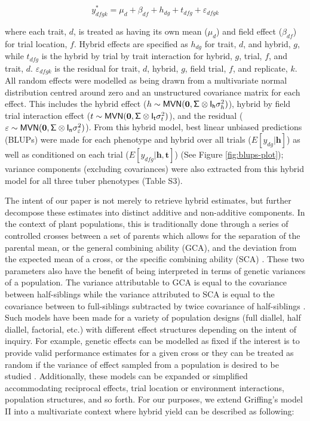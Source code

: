 \begin{equation}
y_{dfgk}^* = \mu_d + \beta_{df} + h_{dg} + t_{dfg} + \varepsilon_{dfgk}
\label{eq:hybrid}
\end{equation}

where each trait, \(d\), is treated as having its own mean (\(\mu_d\)) and field effect (\(\beta_{df}\)) for trial location, \(f\). Hybrid effects are specified as \(h_{dg}\) for trait, \(d\), and hybrid, \(g\), while \(t_{dfg}\) is the hybrid by trial by trait interaction for hybrid, \(g\), trial, \(f\), and trait, \(d\). \(\varepsilon_{dfgk}\) is the residual for trait, \(d\), hybrid, \(g\), field trial, \(f\), and replicate, \(k\). All random effects were modelled as being drawn from a multivariate normal distribution centred around zero and an unstructured covariance matrix for each effect. This includes the hybrid effect (\(h\sim \mathsf{MVN}({\bf 0},\mathsf{\Sigma\otimes I_h} \sigma_h^2)\)), hybrid by field trial interaction effect (\(t\sim \mathsf{MVN}({\bf 0},\mathsf{\Sigma\otimes I_t}\sigma_t^2)\)), and the residual (\(\varepsilon \sim \mathsf{MVN}({\bf 0},\mathsf{\Sigma\otimes I_n}\sigma_\varepsilon^2)\)). From this hybrid model, best linear unbiased predictions (BLUPs) were made for each phenotype and hybrid over all trials (\(E[y_{dg}|\mathbf{h}]\)) as well as conditioned on each trial (\(E[y_{dfg}|\mathbf{h},\mathbf{t}]\)) (See Figure \ref{fig:blups-plot}); variance components (excluding covariances) were also extracted from this hybrid model for all three tuber phenotypes (Table S3).

The intent of our paper is not merely to retrieve hybrid estimates, but further decompose these estimates into distinct additive and non-additive components. In the context of plant populations, this is traditionally done through a series of controlled crosses between a set of parents which allows for the separation of the parental mean, or the general combining ability (GCA), and the deviation from the expected mean of a cross, or the specific combining ability (SCA) \parencite{Sprague1942}. These two parameters also have the benefit of being interpreted in terms of genetic variances of a population. The variance attributable to GCA is equal to the covariance between half-siblings while the variance attributed to SCA is equal to the covariance between to full-siblings subtracted by twice covariance of half-siblings \parencite{Bernardo2002}. Such models have been made for a variety of population designs (full diallel, half diallel, factorial, etc.) with different effect structures depending on the intent of inquiry. For example, genetic effects can be modelled as fixed if the interest is to provide valid performance estimates for a given cross or they can be treated as random if the variance of effect sampled from a population is desired to be studied \parencite{Eisenhart1947}. Additionally, these models can be expanded or simplified accommodating reciprocal effects, trial location or environment interactions, population structures, and so forth. For our purposes, we extend Griffing's model II \parencite{Griffing1956} into a multivariate context where hybrid yield can be described as following:

